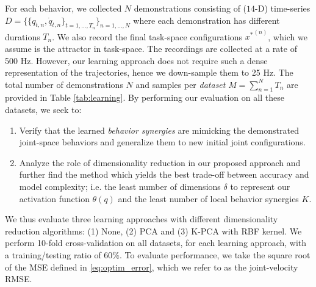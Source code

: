 \documentclass[letterpaper, 10 pt, conference,fleqn]{ieeeconf}
\begin{document}
\noindent For each behavior, we collected $N$ demonstrations consisting of ($14$-D) time-series $D=\{\{ q_{t,n},\dot{q}_{t,n} \}_{t=1,\dots, T_n}\}_{n=1,\dots,N}$ where each demonstration has different durations $T_n$. We also record the final task-space configurations ${x^*}^{(n)}$, which we assume is the attractor in task-space. The recordings are collected at a rate of 500 Hz. However, our learning approach does not require such a dense representation of the trajectories, hence we down-sample them to 25 Hz. The total number of demonstrations $N$ and samples per \textit{dataset} $M = \sum_{n=1}^{N}T_n$ are provided in Table \ref{tab:learning}. By performing our evaluation on all these datasets, we seek to: 
\begin{enumerate}[leftmargin=*]
\item Verify that the learned \textit{behavior synergies} are mimicking the demonstrated joint-space behaviors and generalize them to new initial joint configurations.
\item Analyze the role of dimensionality reduction in our proposed approach and further find the method which yields the best trade-off between accuracy and model complexity; i.e. the least number of dimensions $\delta$ to represent our activation function $\theta(q)$ and the least number of local behavior synergies $K$.
\end{enumerate}
We thus evaluate three learning approaches with different dimensionality reduction algorithms: (1) None, (2) PCA and (3) K-PCA with RBF kernel.
We perform 10-fold cross-validation on all datasets, for each learning approach, with a training/testing ratio of $60 \%$. To evaluate performance, we take the square root of the MSE defined in \eqref{eq:optim_error}, which we refer to as the joint-velocity RMSE. 
\end{document}

